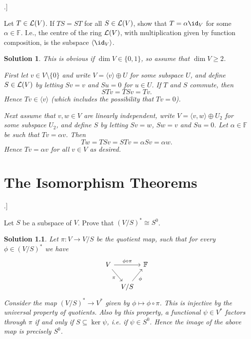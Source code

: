 \documentclass[article, a4paper, 11pt, oneside]{memoir}
\numberwithin{equation}{chapter}
\renewenvironment{exerciseframed}[1][]{%
    \setsepchar{.}%
    \readlist*\mylist{#1}%
    \def\exlabel{\mylist[1].\mylist[2]}%
    \begin{exerciseframed*}[\exlabel]%
    \label{ex:#1}%
}{%
    \end{exerciseframed*}%
}
\theoremstyle{nonumberplain}
\newtheorem{solution}{Solution}
\begin{document}
\newcommand{\field}{\mathbb{F}}

\begin{exerciseframed}[2.22]
    Let $T \in \mathcal{L}(V)$. If $TS = ST$ for all $S \in \mathcal{L}(V)$, show that $T = \alpha \id_V$ for some $\alpha \in \field$. I.e., the centre of the ring $\mathcal{L}(V)$, with multiplication given by function composition, is the subspace $\langle \id_V \rangle$.
\end{exerciseframed}

\begin{solution}
    This is obvious if $\dim V \in \{0,1\}$, so assume that $\dim V \geq 2$.

    First let $v \in V \setminus \{0\}$ and write $V = \langle v \rangle \oplus U$ for some subspace $U$, and define $S \in \mathcal{L}(V)$ by letting $Sv = v$ and $Su = 0$ for $u \in U$. If $T$ and $S$ commute, then
    \begin{equation*}
        STv
            = TSv
            = Tv.
    \end{equation*}
    Hence $Tv \in \langle v \rangle$ (which includes the possibility that $Tv = 0$).

    Next assume that $v,w \in V$ are linearly independent, write $V = \langle v, w \rangle \oplus U_2$ for some subspace $U_2$, and define $S$ by letting $Sv = w$, $Sw = v$ and $Su = 0$. Let $\alpha \in \field$ be such that $Tv = \alpha v$. Then
    \begin{equation*}
        Tw
            = TSv
            = STv
            = \alpha Sv
            = \alpha w.
    \end{equation*}
    Hence $Tv = \alpha v$ for all $v \in V$ as desired.
\end{solution}


\chapter{The Isomorphism Theorems}

\begin{exerciseframed}[3.18]
    Let $S$ be a subspace of $V$. Prove that $(V/S)^* \cong S^0$.
\end{exerciseframed}

\begin{solution}
    Let $\pi \colon V \to V/S$ be the quotient map, such that for every $\phi \in (V/S)^*$ we have
    \begin{equation*}
        \begin{tikzcd}[column sep=tiny]
            V
                \ar[rr, "\phi \circ \pi"]
                \ar[rd, "\pi", swap]
            && \field \\
            & V/S
                \ar[ru, "\phi", swap]
        \end{tikzcd}
    \end{equation*}
    Consider the map $(V/S)^* \to V^*$ given by $\phi \mapsto \phi \circ \pi$. This is injective by the universal property of quotients. Also by this property, a functional $\psi \in V^*$ factors through $\pi$ if and only if $S \subseteq \ker \psi$, i.e. if $\psi \in S^0$. Hence the image of the above map is precisely $S^0$.
\end{solution}
\end{document}
